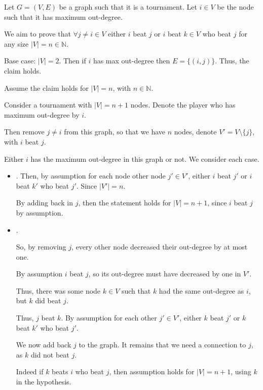 \begin{soln}
	Let \(G = (V, E)\) be a graph such that it is a tournament. Let \(i \in V\) be the node such that it has maximum out-degree.

	We aim to prove that \(\forall j \neq i \in V\) either \(i\) beat \(j\) or \(i\) beat \(k \in V\) who beat \(j\) for any size \(|V| = n \in \mathbb{N}\).

	Base case: \(|V| = 2\). Then if \(i\) has max out-degree then \(E = \{(i, j)\}\). Thus, the claim holds.

	Assume the claim holds for \(|V| = n\), with \(n \in \mathbb{N}\).

	Consider a tournament with \(|V| = n + 1\) nodes. Denote the player who has maximum out-degree by \(i\).

	Then remove \(j \neq i\) from this graph, so that we have \(n\) nodes, denote \(V' = V\setminus \{j\}\), with \(i\) beat \(j\).

	Either \(i\) has the maximum out-degree in this graph or not. We consider each case.

	\begin{itemize}
		\item {}. Then, by assumption for each node other node \(j' \in V'\), either \(i\) beat \(j'\) or \(i\) beat \(k'\) who beat \(j'\).
		      Since \(|V'| = n\).

		      By adding back in \(j\), then the statement holds for \(|V| = n + 1\), since \(i\) beat \(j\) by assumption.

		\item {}.

		      So, by removing \(j\), every other node decreased their out-degree by at most one.

		      By assumption \(i\) beat \(j\), so its out-degree must have decreased by one in \(V'\).

		      Thus, there was some node \(k \in V\) such that \(k\) had the same out-degree as \(i\), but \(k\) did beat \(j\).

		      Thus, \(j\) beat \(k\). By assumption for each other \(j' \in V'\), either \(k\) beat \(j'\) or \(k\) beat \(k'\) who beat \(j'\).

		      We now add back \(j\) to the graph. It remains that we need a connection to \(j\), as \(k\) did not beat \(j\).

		      Indeed if \(k\) beats \(i\) who beat \(j\), then assumption holds for \(|V| = n + 1\), using \(k\) in the hypothesis.


\end{itemize}
\end{soln}
